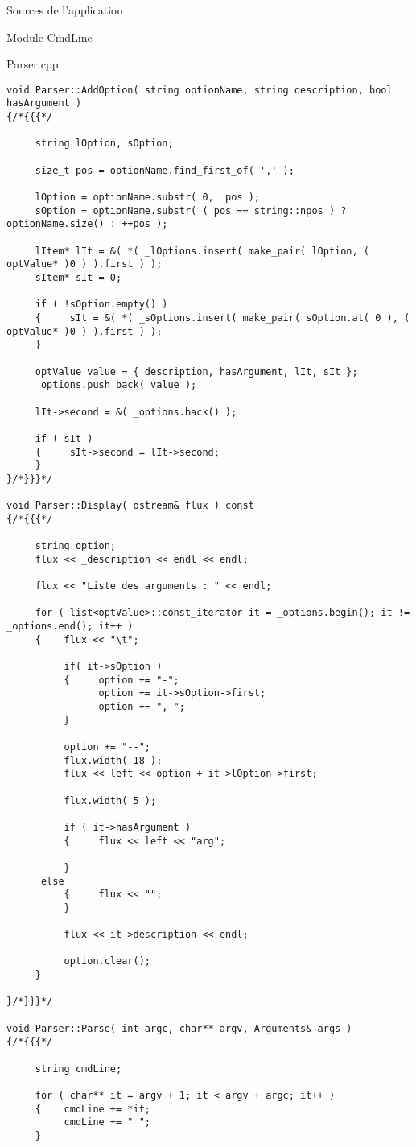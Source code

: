\documentclass{article}
\begin{document}
\begin{section}{Sources de l'application}
\begin{subsection}{Module CmdLine}
\begin{paragraph}{Parser.cpp}
\begin{verbatim}
void Parser::AddOption( string optionName, string description, bool hasArgument )
{/*{{{*/

     string lOption, sOption;

     size_t pos = optionName.find_first_of( ',' );

     lOption = optionName.substr( 0,  pos );
     sOption = optionName.substr( ( pos == string::npos ) ? optionName.size() : ++pos );

     lItem* lIt = &( *( _lOptions.insert( make_pair( lOption, ( optValue* )0 ) ).first ) );
     sItem* sIt = 0;

     if ( !sOption.empty() ) 
     {	   sIt = &( *( _sOptions.insert( make_pair( sOption.at( 0 ), ( optValue* )0 ) ).first ) );
     }

     optValue value = { description, hasArgument, lIt, sIt };
     _options.push_back( value );

     lIt->second = &( _options.back() );

     if ( sIt ) 
     {     sIt->second = lIt->second;
     }
}/*}}}*/

void Parser::Display( ostream& flux ) const
{/*{{{*/

     string option;
     flux << _description << endl << endl;

     flux << "Liste des arguments : " << endl;

     for ( list<optValue>::const_iterator it = _options.begin(); it != _options.end(); it++ ) 
     {    flux << "\t";

          if( it->sOption ) 
          {     option += "-";
                option += it->sOption->first;
                option += ", ";
          }

          option += "--";
          flux.width( 18 );
          flux << left << option + it->lOption->first;

          flux.width( 5 );

          if ( it->hasArgument ) 
          {     flux << left << "arg";

          }
	  else 
          {     flux << "";
          }

          flux << it->description << endl;

          option.clear();
     }

}/*}}}*/

void Parser::Parse( int argc, char** argv, Arguments& args )
{/*{{{*/

     string cmdLine;

     for ( char** it = argv + 1; it < argv + argc; it++ ) 
     {	  cmdLine += *it;
          cmdLine += " ";
     }


\end{verbatim}
\end{paragraph}
\end{subsection}
\end{section}
\end{document}

